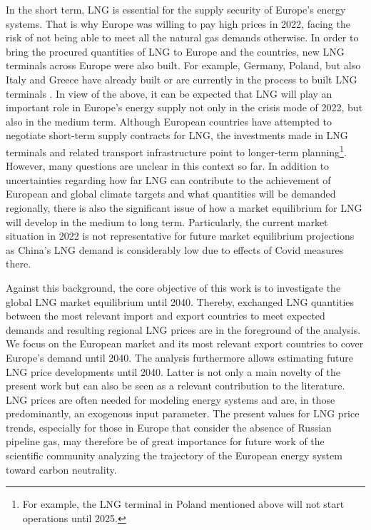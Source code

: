 In the short term, LNG is essential for the supply security of Europe's energy systems. That is why Europe was willing to pay high prices in 2022, facing the risk of not being able to meet all the natural gas demands otherwise. In order to bring the procured quantities of LNG to Europe and the countries, new LNG terminals across Europe were also built. For example, Germany, Poland, but also Italy and Greece have already built or are currently in the process to built LNG terminals \cite{lng_terminals}. In view of the above, it can be expected that LNG will play an important role in Europe's energy supply not only in the crisis mode of 2022, but also in the medium term. Although European countries have attempted to negotiate short-term supply contracts for LNG, the investments made in LNG terminals and related transport infrastructure point to longer-term planning\footnote{For example, the LNG terminal in Poland mentioned above will not start operations until 2025.}. However, many questions are unclear in this context so far. In addition to uncertainties regarding how far LNG can contribute to the achievement of European and global climate targets and what quantities will be demanded regionally, there is also the significant issue of how a market equilibrium for LNG will develop in the medium to long term. Particularly, the current market situation in 2022 is not representative for future market equilibrium projections as China's LNG demand is considerably low due to effects of Covid measures there.\vspace{0.35cm}    

Against this background, the core objective of this work is to investigate the global LNG market equilibrium until 2040. Thereby, exchanged LNG quantities between the most relevant import and export countries to meet expected demands and resulting regional LNG prices are in the foreground of the analysis. We focus on the European market and its most relevant export countries to cover Europe's demand until 2040. The analysis furthermore allows estimating future LNG price developments until 2040. Latter is not only a main novelty of the present work but can also be seen as a relevant contribution to the literature. LNG prices are often needed for modeling energy systems and are, in those predominantly, an exogenous input parameter. The present values for LNG price trends, especially for those in Europe that consider the absence of Russian pipeline gas, may therefore be of great importance for future work of the scientific community analyzing the trajectory of the European energy system toward carbon neutrality.\vspace{0.35cm}    

